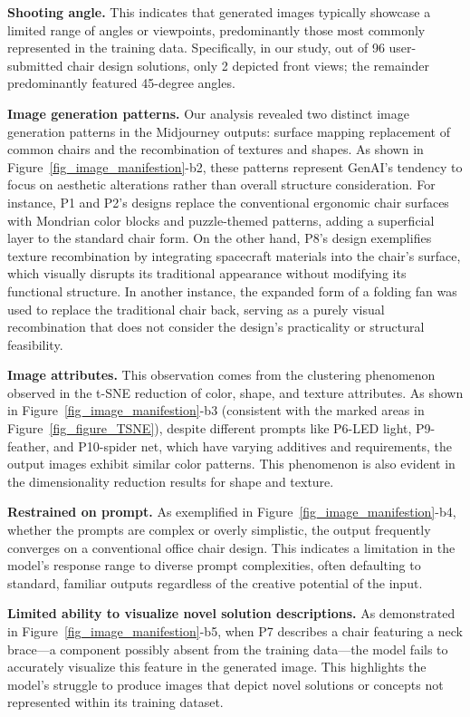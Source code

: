 \textbf{Shooting angle.} This indicates that generated images typically showcase a limited range of angles or viewpoints, predominantly those most commonly represented in the training data. Specifically, in our study, out of 96 user-submitted chair design solutions, only 2 depicted front views; the remainder predominantly featured 45-degree angles.

\textbf{Image generation patterns.} Our analysis revealed two distinct image generation patterns in the Midjourney outputs: surface mapping replacement of common chairs and the recombination of textures and shapes. As shown in Figure~\ref{fig_image_manifestion}-b2, these patterns represent GenAI’s tendency to focus on aesthetic alterations rather than overall structure consideration. For instance, P1 and P2’s designs replace the conventional ergonomic chair surfaces with Mondrian color blocks and puzzle-themed patterns, adding a superficial layer to the standard chair form. On the other hand, P8’s design exemplifies texture recombination by integrating spacecraft materials into the chair’s surface, which visually disrupts its traditional appearance without modifying its functional structure. In another instance, the expanded form of a folding fan was used to replace the traditional chair back, serving as a purely visual recombination that does not consider the design’s practicality or structural feasibility.

\textbf{Image attributes.} This observation comes from the clustering phenomenon observed in the t-SNE reduction of color, shape, and texture attributes. As shown in Figure~\ref{fig_image_manifestion}-b3 (consistent with the marked areas in Figure~\ref{fig_figure_TSNE}), despite different prompts like P6-LED light, P9-feather, and P10-spider net, which have varying additives and requirements, the output images exhibit similar color patterns. This phenomenon is also evident in the dimensionality reduction results for shape and texture.

\textbf{Restrained on prompt.} As exemplified in Figure~\ref{fig_image_manifestion}-b4, whether the prompts are complex or overly simplistic, the output frequently converges on a conventional office chair design. This indicates a limitation in the model’s response range to diverse prompt complexities, often defaulting to standard, familiar outputs regardless of the creative potential of the input.

\textbf{Limited ability to visualize novel solution descriptions.} As demonstrated in Figure~\ref{fig_image_manifestion}-b5, when P7 describes a chair featuring a neck brace—a component possibly absent from the training data—the model fails to accurately visualize this feature in the generated image. This highlights the model’s struggle to produce images that depict novel solutions or concepts not represented within its training dataset.

